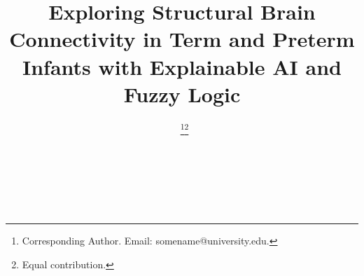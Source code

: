 \documentclass[doubleblind]{ecai}
\begin{document}

\begin{frontmatter}




\title{Exploring Structural Brain Connectivity in Term and Preterm Infants with Explainable AI and Fuzzy Logic}




\author[A]{~\thanks{Corresponding Author. Email: somename@university.edu.}\footnote{Equal contribution.}}
\author[B]{~\footnotemark}
\author[B,C]{~} 

\address[A]{Short Affiliation of First Author}
\address[B]{Short Affiliation of Second Author and Third Author}
\address[C]{Short Alternate Affiliation of Third Author}


\begin{abstract}


\end{abstract}
\end{frontmatter}
\end{document}
